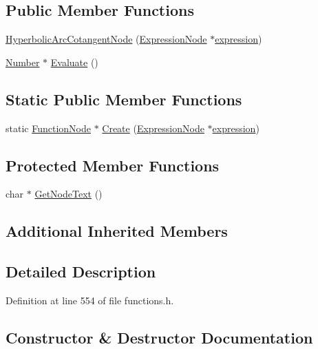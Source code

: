 \subsection*{Public Member Functions}
\begin{DoxyCompactItemize}
\item 
\hyperlink{classHyperbolicArcCotangentNode_aeb8d5f5d7f623a6f2c0da363e0eec026}{Hyperbolic\+Arc\+Cotangent\+Node} (\hyperlink{classExpressionNode}{Expression\+Node} $\ast$\hyperlink{classFunctionNode_ad7577b179a1937aaf8a0058bb5b546dc}{expression})
\item 
\hyperlink{structNumber}{Number} $\ast$ \hyperlink{classHyperbolicArcCotangentNode_a517890860c5161dae48ef8e26b952144}{Evaluate} ()
\end{DoxyCompactItemize}
\subsection*{Static Public Member Functions}
\begin{DoxyCompactItemize}
\item 
static \hyperlink{classFunctionNode}{Function\+Node} $\ast$ \hyperlink{classHyperbolicArcCotangentNode_a51c29b7be38fc24686add16377b6d883}{Create} (\hyperlink{classExpressionNode}{Expression\+Node} $\ast$\hyperlink{classFunctionNode_ad7577b179a1937aaf8a0058bb5b546dc}{expression})
\end{DoxyCompactItemize}
\subsection*{Protected Member Functions}
\begin{DoxyCompactItemize}
\item 
char $\ast$ \hyperlink{classHyperbolicArcCotangentNode_a6247a90dadcc0e1b301f2e0033865cf2}{Get\+Node\+Text} ()
\end{DoxyCompactItemize}
\subsection*{Additional Inherited Members}


\subsection{Detailed Description}


Definition at line 554 of file functions.\+h.



\subsection{Constructor \& Destructor Documentation}
